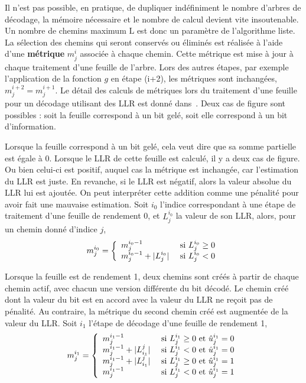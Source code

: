 Il n'est pas possible, en pratique, de dupliquer indéfiniment le nombre d'arbres de décodage, la mémoire nécessaire et le nombre de calcul devient vite insoutenable. Un nombre de chemins maximum $\mathrm{L}$ est donc un paramètre de l'algorithme liste. La sélection des chemins qui seront conservés ou éliminés est réalisée à l'aide d'une \textbf{métrique} $m^i_j$ associée à chaque chemin. Cette métrique est mise à jour à chaque traitement d'une feuille de l'arbre. Lors des autres étapes, par exemple l'application de la fonction $g$ en étape (i+2), les métriques sont inchangées, $m^{i+2}_j = m^{i+1}_j$. Le détail des calculs de métriques lors du traitement d'une feuille pour un décodage utilisant des LLR est donné dans~\cite{balatsoukas-stimming_llr-based_2015}. Deux cas de figure sont possibles : soit la feuille correspond à un bit gelé, soit elle correspond à un bit d'information.

Lorsque la feuille correspond à un bit gelé, cela veut dire que sa somme partielle est égale à 0. Lorsque le LLR de cette feuille est calculé, il y a deux cas de figure. Ou bien celui-ci est positif, auquel cas la métrique est inchangée, car l'estimation du LLR est juste. 
En revanche, si le LLR est négatif, alors la valeur absolue du LLR lui est ajoutée. On peut interpréter cette addition comme une \og pénalité \fg pour avoir fait une mauvaise estimation. Soit $i_0$ l'indice correspondant à une étape de traitement d'une feuille de rendement 0, et $L_j^{i_0}$ la valeur de son LLR, alors, pour un chemin donné d'indice $j$, 
\begin{equation*}
m^{i_0}_j=\left\{\begin{array}{l c l} m_j^{{i_0}-1} & \text{ si } L_j^{i_0} \geq 0 \\ m_j^{{i_0}-1} + |L_j^{i_0}| & \text{ si } L_j^{i_0} < 0 \end{array}\right.
\end{equation*}

Lorsque la feuille est de rendement 1, deux chemins sont créés à partir de chaque chemin actif, avec chacun une version différente du bit décodé. Le chemin créé dont la valeur du bit est en accord avec la valeur du LLR ne reçoit pas de pénalité. Au contraire, la métrique du second chemin créé est augmentée de la valeur du LLR. Soit $i_1$ l'étape de décodage d'une feuille de rendement 1,
\begin{equation*}
m^{i_1}_j=\left\{\begin{array}{l c l} m_j^{{i_1}-1}               & \text{ si } L^{i_1}_j \geq 0 \text{ et } \hat{u}^{i_1}_j = 0
                                   \\ m_j^{{i_1}-1} + |L^j_{i_1}| & \text{ si } L^{i_1}_j < 0    \text{ et } \hat{u}^{i_1}_j = 0
                                   \\ m_j^{{i_1}-1} + |L^j_{i_1}| & \text{ si } L^{i_1}_j \geq 0 \text{ et } \hat{u}^{i_1}_j = 1
                                   \\ m_j^{{i_1}-1}               & \text{ si } L^{i_1}_j < 0    \text{ et } \hat{u}^{i_1}_j = 1

                \end{array}\right.
\end{equation*}

